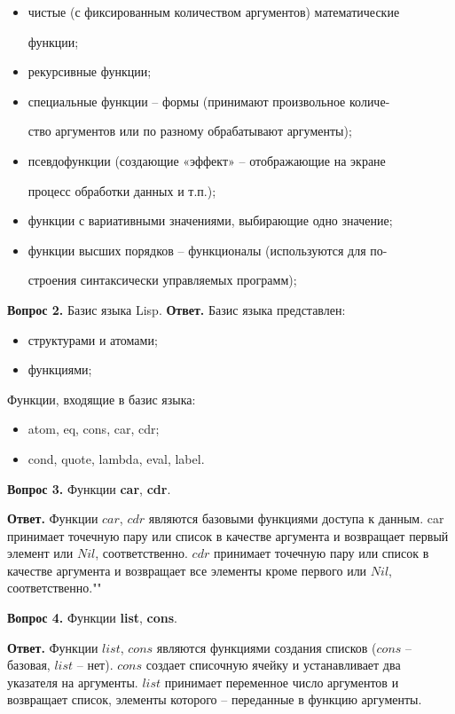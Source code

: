 \documentclass[12pt]{report}
\begin{document}
\begin{itemize}
	\item чистые (с фиксированным количеством аргументов) математические

	функции;

	\item рекурсивные функции;

	\item специальные функции – формы (принимают произвольное количе-

	ство аргументов или по разному обрабатывают аргументы);

	\item псевдофункции (создающие «эффект» – отображающие на экране

	процесс обработки данных и т.п.);

	\item функции с вариативными значениями, выбирающие одно значение;

	\item функции высших порядков – функционалы (используются для по-

	строения синтаксически управляемых программ);
\end{itemize}

\textbf{Вопрос 2.} Базис языка Lisp. \newline
\indent\textbf{Ответ. }
Базис языка представлен:
\begin{itemize}
	\item структурами и атомами;
	\item функциями;
\end{itemize}

Функции, входящие в базис языка:
\begin{itemize}
	\item atom, eq, cons, car, cdr;

	\item cond, quote, lambda, eval, label.
\end{itemize}
	
\textbf{Вопрос 3.} Функции \textbf{car}, \textbf{cdr}.
	
\textbf{Ответ.} Функции $car$, $cdr$ являются базовыми функциями доступа к
данным. car принимает точечную пару или список в качестве аргумента
и возвращает первый элемент или $Nil$, соответственно. $cdr$ принимает точечную пару или список в качестве аргумента и возвращает все элементы
кроме первого или $Nil$, соответственно.""\newline
	
\textbf{Вопрос 4.} Функции \textbf{list}, \textbf{cons}.
	
\textbf{Ответ.} Функции $list$, $cons$ являются функциями создания списков
($cons$ – базовая, $list$ – нет). $cons$ создает списочную ячейку и устанавливает два указателя на аргументы. $list$ принимает переменное число аргументов и возвращает список, элементы которого – переданные в функцию
аргументы.
	
	
	
	
\end{document}
